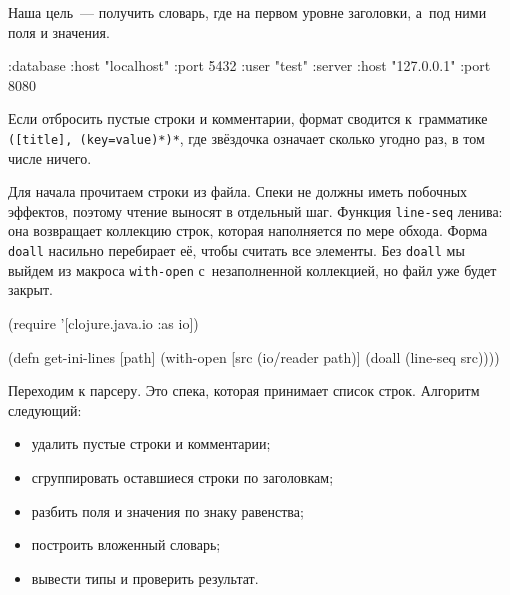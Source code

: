 Наша цель~--- получить словарь, где на первом уровне заголовки, а~под ними поля
и значения.

\begin{english}
  \begin{clojure}
{:database {:host "localhost"
            :port 5432
            :user "test"}
 :server {:host "127.0.0.1"
          :port 8080}}
  \end{clojure}
\end{english}

Если отбросить пустые строки и комментарии, формат сводится к~грамматике
\verb|([title], (key=value)*)*|, где звёздочка означает сколько угодно раз, в
том числе ничего.


Для начала прочитаем строки из файла. Спеки не должны иметь побочных эффектов,
поэтому чтение выносят в отдельный шаг. Функция \verb|line-seq| ленива: она
возвращает коллекцию строк, которая наполняется по мере обхода. Форма
\verb|doall| насильно перебирает её, чтобы считать все элементы. Без
\verb|doall| мы выйдем из макроса \verb|with-open| с~незаполненной
коллекцией, но файл уже будет закрыт.



\begin{english}
  \begin{clojure}
(require '[clojure.java.io :as io])

(defn get-ini-lines [path]
  (with-open [src (io/reader path)]
    (doall (line-seq src))))
  \end{clojure}
\end{english}

Переходим к парсеру. Это спека, которая принимает список строк. Алгоритм
следующий:

\begin{itemize}

\item
  удалить пустые строки и комментарии;

\item
  сгруппировать оставшиеся строки по заголовкам;

\item
  разбить поля и значения по знаку равенства;

\item
  построить вложенный словарь;

\item
  вывести типы и проверить результат.

\end{itemize}

